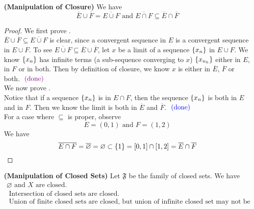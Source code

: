 \documentclass{report}
\begin{document}
\begin{theorem}
\label{1.2.4}
\textbf{(Manipulation of Closure)} We have
\begin{equation}
\overline{E}\cup \overline{F}=\overline{E\cup F}\text{ and }\overline{E\cap F}\subseteq \overline{E}\cap \overline{F}
\end{equation}
\end{theorem}
\begin{proof}
We first prove .\\

$\overline{E}\cup \overline{F}\subseteq \overline{E\cup F}$ is clear, since a convergent sequence in $E$ is a convergent sequence in $E\cup F$. To see $\overline{E\cup F}\subseteq \overline{E}\cup \overline{F}$, let $x$ be a limit of a sequence  $\{ x_n \}$ in $E\cup F$. We know $\{ x_n \}$ has infinite terms (a sub-sequence converging to $x$) $\{ x_{n_k} \}$ either in $E$, in $F$ or in both. Then by definition of closure, we know $x$ is either in $\overline{E}$, $\overline{F}$ or both. $\textcolor{violet}{\text{ (done) }}$\\


We now prove .\\

Notice that if a sequence $\{ x_n \}$ is in $E\cap F$, then the sequence $\{ x_n \}$ is both in $E$ and in $F$. Then we know the limit is both in  $\overline{E}$ and $\overline{F}$. $\textcolor{blue}{\text{ (done) }}$\\

For a case where $\subseteq $ is proper, observe
\begin{equation}
E=(0,1)\text{ and }F=(1,2)
\end{equation}
We have
\begin{equation}
\overline{E\cap F}=\overline{\varnothing}=\varnothing \subset \{ 1 \}=[0,1]\cap [1,2]=\overline{E}\cap \overline{F}
\end{equation}
\end{proof}
\begin{theorem}
\label{1.2.5}
\textbf{(Manipulation of Closed Sets)} Let $\mathfrak{F}$ be the family of closed sets. We have
\begin{gather}
\varnothing\text{ and }X\text{ are closed. }\\
\text{ Intersection of closed sets are closed. }\\
\text{ Union of finite closed sets are closed, but union of infinite closed set may not be closed. }
\end{gather}
\end{theorem}
\end{document}
